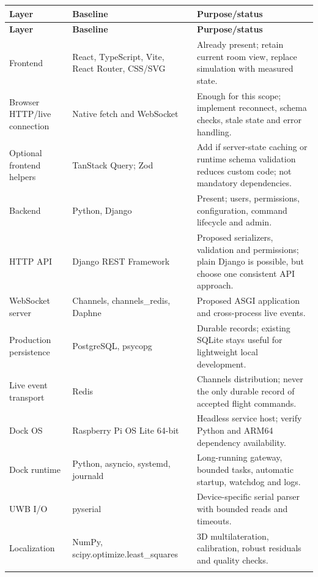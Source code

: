 \documentclass[10pt,letterpaper]{article}
\begin{document}
\begingroup\small\begin{longtable}{P{1.329in}P{2.060in}P{3.256in}}
\toprule{}\textbf{Layer} & \textbf{Baseline} & \textbf{Purpose/status} \\\midrule\endfirsthead
\toprule{}\textbf{Layer} & \textbf{Baseline} & \textbf{Purpose/status} \\\midrule\endhead
\bottomrule\endfoot
Frontend & React, TypeScript, Vite, React Router, CSS/SVG & Already present; retain current room view, replace simulation with measured state. \\ \addlinespace[2pt]
Browser HTTP/live connection & Native fetch and WebSocket & Enough for this scope; implement reconnect, schema checks, stale state and error handling. \\ \addlinespace[2pt]
Optional frontend helpers & TanStack Query; Zod & Add if server-state caching or runtime schema validation reduces custom code; not mandatory dependencies. \\ \addlinespace[2pt]
Backend & Python, Django & Present; users, permissions, configuration, command lifecycle and admin. \\ \addlinespace[2pt]
HTTP API & Django REST Framework & Proposed serializers, validation and permissions; plain Django is possible, but choose one consistent API approach. \\ \addlinespace[2pt]
WebSocket server & Channels, channels\_redis, Daphne & Proposed ASGI application and cross-process live events. \\ \addlinespace[2pt]
Production persistence & PostgreSQL, psycopg & Durable records; existing SQLite stays useful for lightweight local development. \\ \addlinespace[2pt]
Live event transport & Redis & Channels distribution; never the only durable record of accepted flight commands. \\ \addlinespace[2pt]
Dock OS & Raspberry Pi OS Lite 64-bit & Headless service host; verify Python and ARM64 dependency availability. \\ \addlinespace[2pt]
Dock runtime & Python, asyncio, systemd, journald & Long-running gateway, bounded tasks, automatic startup, watchdog and logs. \\ \addlinespace[2pt]
UWB I/O & pyserial & Device-specific serial parser with bounded reads and timeouts. \\ \addlinespace[2pt]
Localization & NumPy, scipy.optimize.least\_squares & 3D multilateration, calibration, robust residuals and quality checks. \\ \addlinespace[2pt]

\end{longtable}
\end{document}
